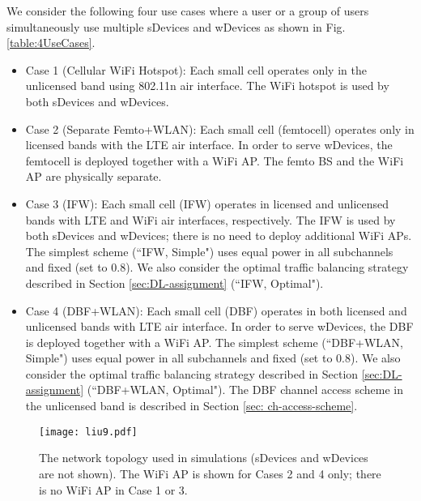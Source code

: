 \documentclass[journal,final,letterpaper,10pt,doublecolumn,twoside]{IEEEtran}
\begin{document}
We consider the following four use cases where a user or a group of users simultaneously use multiple sDevices and wDevices as shown in Fig. \ref{table:4UseCases}.
\begin{itemize}
\item   Case 1 (Cellular WiFi Hotspot): Each small cell operates
only in  the unlicensed band using 802.11n air interface. The WiFi hotspot is used by both sDevices and wDevices.



\item   Case 2 (Separate Femto+WLAN): Each small cell (femtocell) operates only
in licensed bands with the LTE air interface. In order to serve wDevices, the femtocell is deployed together with a WiFi AP. The femto BS and the WiFi AP are physically separate.

\item   Case 3 (IFW): Each small cell (IFW) \cite{femto-forum-IFW}
operates in licensed and unlicensed bands with LTE and WiFi air
interfaces, respectively. The IFW is used by both sDevices and wDevices; there is no need to deploy additional WiFi APs. The simplest scheme (``IFW, Simple") uses equal power in all subchannels and fixed  (set to 0.8). We also consider the optimal traffic balancing strategy described in Section \ref{sec:DL-assignment} (``IFW, Optimal").

\item   Case 4 (DBF+WLAN): Each small cell (DBF)
operates in both licensed and unlicensed bands with LTE air
interface. In order to serve wDevices, the DBF is deployed together with a WiFi AP. The simplest scheme (``DBF+WLAN, Simple") uses equal power in all subchannels and fixed  (set to 0.8). We also consider the optimal traffic balancing strategy described in Section \ref{sec:DL-assignment} (``DBF+WLAN, Optimal"). The DBF channel access scheme in the unlicensed band is described in Section \ref{sec: ch-access-scheme}.

\end{itemize}


\begin{figure}
  \center
  \texttt{[image: liu9.pdf]}
  \caption{The network topology used in simulations (sDevices and wDevices are not shown). The WiFi AP is shown for Cases 2 and 4 only; there is no WiFi AP in Case 1 or 3.} \label{fig_topology}
\end{figure}
\end{document}
